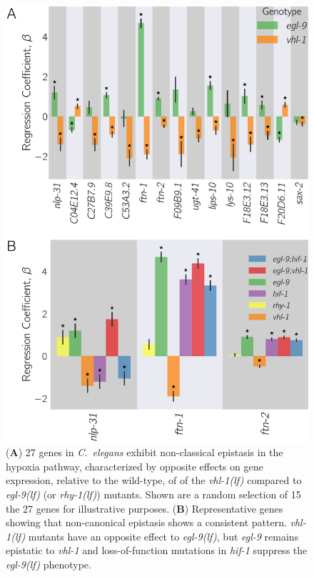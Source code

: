 \documentclass[9pt,twocolumn,twoside]{pnas-new}
\newcommand{\cel}{\emph{C.~elegans}}
\newcommand{\gene}[1]{\emph{#1}}
\newcommand{\egl}{\emph{\mbox{egl-9}(lf)}}
\newcommand{\rhy}{\emph{\mbox{rhy-1}(lf)}}
\newcommand{\vhl}{\emph{\mbox{vhl-1}(lf)}}
\begin{document}
\begin{figure}[tbhp]
\centering
\includegraphics[width=\linewidth]{figs/hif1oh_epistasis.pdf}
\caption{
(\textbf{A}) 27 genes in \cel{} exhibit non-classical epistasis in the hypoxia
pathway, characterized by opposite effects on gene expression, relative to the
wild-type, of of the \vhl{} compared to \egl{} (or
\rhy{}) mutants. Shown are a random selection of 15 the 27 genes for illustrative
purposes.
(\textbf{B}) Representative genes showing that non-canonical epistasis shows a
consistent pattern. \vhl{} mutants have an opposite effect to \egl{}, but
\gene{egl-9} remains epistatic to \gene{vhl-1} and loss-of-function mutations in
\gene{hif-1} suppress the \egl{} phenotype.
}
\label{fig:hif1oh}
\end{figure}
\end{document}
